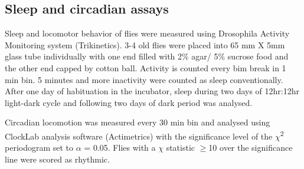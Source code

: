 \subsection*{Sleep and circadian assays}

Sleep and locomotor behavior of flies were measured using Drosophila Activity Monitoring system (Trikinetics).
3-4 old flies were placed into 65 mm X 5mm glass tube individually with one end filled with 2\% agar/ 5\% sucrose food and the other end capped by cotton ball.
Activity is counted every bim break in 1 min bin.
5 minutes and more inactivity were counted as sleep conventionally.
After one day of habituation in the incubator, sleep during two days of 12hr:12hr light-dark cycle and following two days of dark period was analysed.

Circadian locomotion was measured every 30 min bin and analysed using ClockLab analysis software (Actimetrics) with the significance level of the $\chi$\textsuperscript{2} periodogram set to $\alpha$ = 0.05.
Flies with a $\chi$ statistic $\geq$10 over the significance line were scored as rhythmic.
    
  
  
  
  
